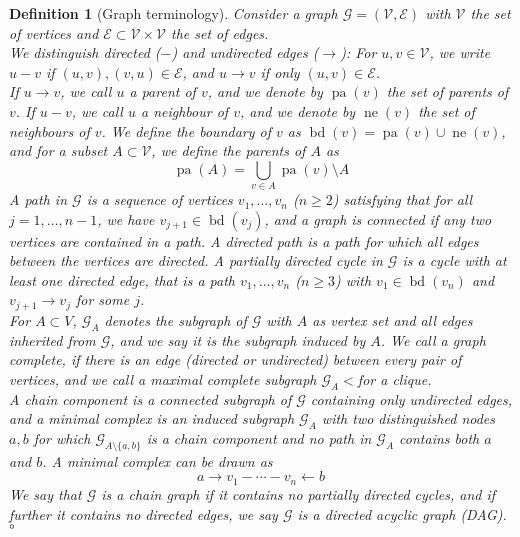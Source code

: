\documentclass[11pt, a4paper]{memoir}
\theoremstyle{break}
\theoremstyle{break}
\newtheorem{innerdefn}{Definition}
\newenvironment{defn}
  {\begin{innerdefn}}
  {\ensuremath{\circ}\end{innerdefn}}
\theoremstyle{nonumberplain}
\DeclareMathOperator{\pa}{pa}
\DeclareMathOperator{\nei}{ne}
\DeclareMathOperator{\bd}{bd}
\begin{document}
\begin{defn}[Graph terminology]
Consider a \emph{graph} $\mathcal{G}=(\mathcal{V},\mathcal{E})$ with $\mathcal{V}$ the set of \emph{vertices} and $\mathcal{E}\subset \mathcal{V}\times \mathcal{V}$ the set of \emph{edges}.\\[5pt]
We distinguish \textit{directed} ($-$) and \textit{undirected} edges ($\to$): For $u,v\in \mathcal{V}$, we write $u-v$ if $(u,v),(v,u)\in \mathcal{E}$, and $u\to v$ if only $(u,v)\in \mathcal{E}$. \\[5pt]
If $u\to v$, we call $u$ a \emph{parent} of $v$, and we denote by $\pa(v)$ the set of parents of $v$. If $u-v$, we call $u$ a \emph{neighbour} of $v$, and we denote by $\nei(v)$ the set of neighbours of $v$. We define the \emph{boundary} of $v$ as $\bd(v)=\pa(v)\cup \nei(v)$, and for a subset $A\subset \mathcal{V}$, we define the parents of $A$ as
$$\pa(A)=\bigcup_{v\in A}\pa(v)\setminus A $$
A \emph{path} in $\mathcal{G}$ is a sequence of vertices $v_1,\ldots, v_n$ ($n \geqslant 2$) satisfying that for all $j=1,\ldots,n-1$, we have $v_{j+1}\in \bd(v_j)$, and a graph is \emph{connected} if any two vertices are contained in a path. A \emph{directed path} is a path for which all edges between the vertices are directed. A \textit{partially directed cycle} in $\mathcal{G}$ is a cycle with at least one directed edge, that is a path $v_1,\ldots, v_n$ ($n \geqslant 3$) with $v_1\in \bd(v_n)$ and $v_{j+1}\to v_j$ for some $j$.\\[5pt]
For $A\subset V$, $\mathcal{G}_A$ denotes the subgraph of $\mathcal{G}$ with $A$ as vertex set and all edges inherited from $\mathcal{G}$, and we say it is the subgraph \emph{induced} by $A$.  We call a graph \emph{complete}, if there is an edge (directed or undirected) between every pair of vertices, and we call a maximal complete subgraph $\mathcal{G}_A <$for a \emph{clique}.\\[5pt]
A \emph{chain component} is a connected  subgraph of $\mathcal{G}$ containing only undirected edges, and a \emph{minimal complex}  is an induced subgraph $\mathcal{G}_A$ with two distinguished nodes $a,b$ for which $\mathcal{G}_{A\setminus \{a,b\}}$ is a chain component and no path in $\mathcal{G}_A$ contains both $a$ and $b$. A minimal complex can be drawn as
$$a\to v_1-\cdots-v_n\gets b$$
We say that $\mathcal{G}$ is a \emph{chain graph} if it contains no partially directed cycles, and if further it contains no directed edges, we say $\mathcal{G}$ is a \emph{directed acyclic graph (DAG)}.
\end{defn}
\end{document}
